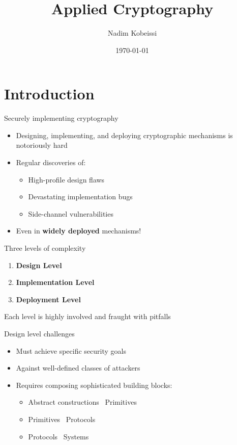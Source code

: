 \documentclass[aspectratio=169, lualatex, handout]{beamer}
\title{Applied Cryptography}
\author{Nadim Kobeissi}
\institute{American University of Beirut}
\date{\today}
\begin{document}
\begin{frame}[plain]
	\titlepage
\end{frame}

\section{Introduction}

\begin{frame}{Securely implementing cryptography}
	\begin{itemize}
		\item Designing, implementing, and deploying cryptographic mechanisms is notoriously hard
		\item Regular discoveries of:
		      \begin{itemize}
			      \item High-profile design flaws
			      \item Devastating implementation bugs
			      \item Side-channel vulnerabilities
		      \end{itemize}
		\item Even in \textbf{widely deployed} mechanisms!
	\end{itemize}
\end{frame}

\begin{frame}{Three levels of complexity}
	\begin{center}
		\Large
		\begin{enumerate}
			\item \textbf{Design Level}
			\item \textbf{Implementation Level}
			\item \textbf{Deployment Level}
		\end{enumerate}
		\vspace{1em}
		\normalsize
		Each level is highly involved and fraught with pitfalls
	\end{center}
\end{frame}

\begin{frame}{Design level challenges}
	\begin{itemize}
		\item Must achieve specific security goals
		\item Against well-defined classes of attackers
		\item Requires composing sophisticated building blocks:
		      \begin{itemize}
			      \item Abstract constructions \rightarrow\ Primitives
			      \item Primitives \rightarrow\ Protocols
			      \item Protocols \rightarrow\ Systems
		      \end{itemize}
	\end{itemize}
\end{frame}
\end{document}
